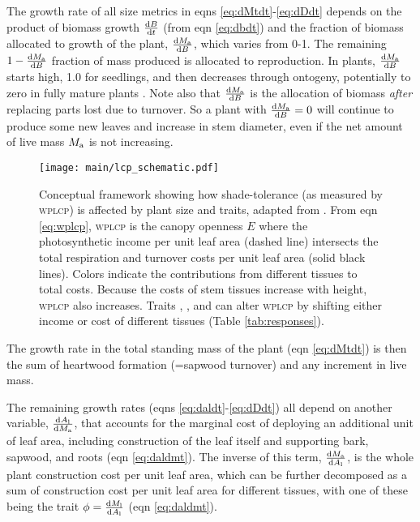 \documentclass[9pt,twocolumn,twoside,lineno]{pnas-new}
\begin{document}
The growth rate of all size metrics in eqns \ref{eq:dMtdt}-\ref{eq:dDdt} depends on the product of biomass growth $\frac{{\rm d}B}{{\rm d}t}$ (from eqn \ref{eq:dbdt}) and the fraction of biomass allocated to growth of the plant, $\frac{{\rm d}M_{\rm a}}{{\rm d}B}$, which varies from 0-1. The remaining $1- \frac{{\rm d}M_{\rm a}}{{\rm d}B}$ fraction of mass produced is allocated to reproduction. In plants, $\frac{{\rm d}M_{\rm a}}{{\rm d}B}$ starts high, 1.0 for seedlings, and then decreases through ontogeny, potentially to zero in fully mature plants \citep{Wenk-2015}. Note also that $\frac{{\rm d}M_{\rm a}}{{\rm d}B}$ is the allocation of biomass \emph{after} replacing parts lost due to turnover. So a plant with $\frac{{\rm d}M_{\rm a}}{{\rm d}B}=0$ will continue to produce some new leaves and increase in stem diameter, even if the net amount of live mass $M_{\rm a}$ is not increasing.


\begin{figure}[!ht]
\centering
\texttt{[image: main/lcp\_schematic.pdf]}

\caption{Conceptual framework showing how shade-tolerance (as measured by \textsc{wplcp}) is affected by plant size and traits, adapted from \citep{Givnish-1988}. From eqn \ref{eq:wplcp}, \textsc{wplcp} is the canopy openness $E$ where the photosynthetic income per unit leaf area (dashed line) intersects the total respiration and turnover costs per unit leaf area (solid black lines). Colors indicate the contributions from different tissues to total costs. Because the costs of stem tissues increase with height, \textsc{wplcp} also increases. Traits {\wood}, {\nitrogen}, and {\lma} can alter \textsc{wplcp} by shifting either income or cost of different tissues (Table \ref{tab:responses}).
\label{fig:wplcp_idea}}
\end{figure}


The growth rate in the total standing mass of the plant (eqn \ref{eq:dMtdt}) is then the sum of heartwood formation (=sapwood turnover) and any increment in live mass.

The remaining growth rates (eqns \ref{eq:daldt}-\ref{eq:dDdt}) all depend on another variable, $\frac{{\rm d}A_{\rm l}} {{\rm d}M_{\rm a}}$, that accounts for the marginal cost of deploying an additional unit of leaf area, including construction of the leaf itself and supporting  bark, sapwood, and roots (eqn \ref{eq:daldmt}). The inverse of this term, $\frac{{\rm d}M_{\rm a} }{{\rm d}A_{\rm l}}$, is the whole plant construction cost per unit leaf area, which can be further decomposed as a sum of construction cost per unit leaf area for different tissues, with one of these being the trait $\phi = \frac{{\rm d}M_{\rm l} }{{\rm d}A_{\rm l}}$ (eqn \ref{eq:daldmt}).
\end{document}
